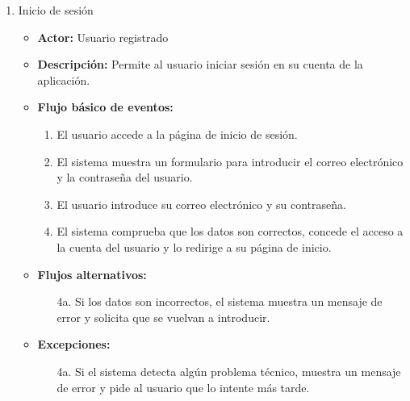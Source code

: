 \begin{enumerate}[CU-1:]
\item{Inicio de sesión}
\begin{itemize}
	\item \textbf{Actor:} Usuario registrado
	\item \textbf{Descripción:} Permite al usuario iniciar sesión en su cuenta de la aplicación.
	\item \textbf{Flujo básico de eventos:}
	\begin{enumerate}[1:]
		\item El usuario accede a la página de inicio de sesión.
		\item El sistema muestra un formulario para introducir el correo electrónico y la contraseña del usuario.
		\item El usuario introduce su correo electrónico y su contraseña.
		\item El sistema comprueba que los datos son correctos, concede el acceso a la cuenta del usuario y lo redirige a su página de inicio.
		\end{enumerate}
	\item \textbf{Flujos alternativos:}
		\begin{itemize}
		\item[4a.] Si los datos son incorrectos, el sistema muestra un mensaje de error y solicita que se vuelvan a introducir.
		\end{itemize}
	\item \textbf{Excepciones:}
		\begin{itemize}
		\item[4a.] Si el sistema detecta algún problema técnico, muestra un mensaje de error y pide al usuario que lo intente más tarde.
		\end{itemize}
\end{itemize}


\end{enumerate}
